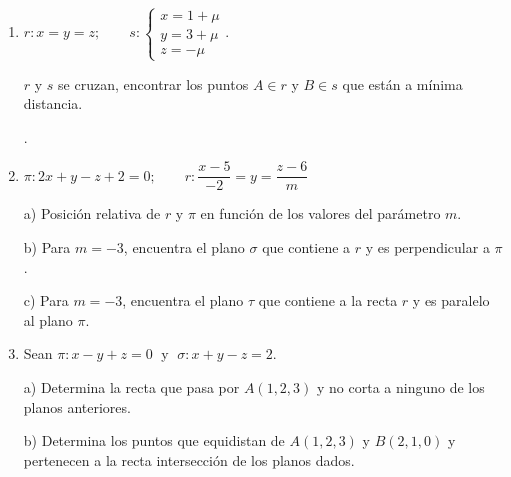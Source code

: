 \begin{enumerate}
\item $r:x=y=z;\qquad s:\begin{cases}x=1+\mu\\y=3+\mu\\z=-\mu\end{cases} $.

$r$ y $s$ se cruzan, encontrar los puntos $A\in r$ y $B\in s$ que están a mínima distancia.

.

\vspace{2mm} 

\item $\pi: 2x+y-z+2=0;\qquad r:\dfrac {x-5}{-2}=y=\dfrac{z-6}{m}$

a) Posición relativa de $r$ y $\pi$ en función de los valores del parámetro  $m$.

b) Para $m=-3$, encuentra el plano $\sigma$ que contiene a $r$ y es perpendicular a $\pi$.

c) Para $m=-3$, encuentra el plano $\tau$ que contiene a la recta $r$ y es paralelo al plano $\pi$.

\vspace{2mm} 


\item Sean $\pi: x-y+z=0\;$ y $\;\sigma: x+y-z=2$.

a) Determina la recta que pasa por $A(1,2,3)$ y no corta a ninguno de los planos anteriores.

b) Determina los puntos que equidistan de $A(1,2,3)$ y $B(2,1,0)$ y pertenecen a la recta intersección de los planos dados.

\vspace{2mm} 






\end{enumerate}
